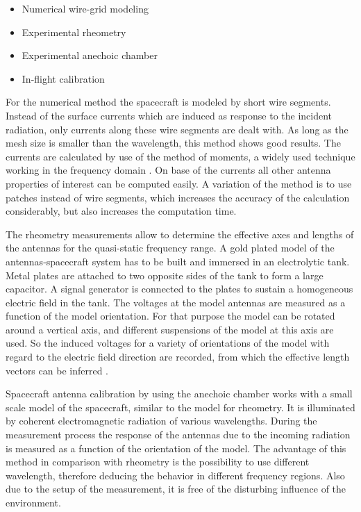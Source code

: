 \documentclass[a4paper,twocolumn]{esapub2005} %
\begin{document}
\begin{itemize}
    \item Numerical wire-grid modeling
\item Experimental rheometry
\item Experimental anechoic chamber
\item In-flight calibration
\end{itemize}

For the numerical method the spacecraft is modeled by short wire segments. Instead of the surface currents which are induced as response to the incident radiation, only currents along these wire segments are dealt with. As long as the mesh size is smaller than the wavelength, this method shows good results. The currents are calculated by use of the method of moments, a widely used technique working in the frequency domain \cite{harrington}. On base of the currents all other antenna properties of interest can be computed easily. A variation of the method is to use patches instead of wire segments, which increases the accuracy of the calculation considerably, but also increases the computation time.

The rheometry measurements allow to determine the effective axes and lengths of the antennas for the quasi-static frequency range. A gold plated model of the antennas-spacecraft system has to be built and immersed in an electrolytic tank. Metal plates are attached to two opposite sides of the tank to form a large capacitor. A signal generator is connected to the plates to sustain a homogeneous electric field in the tank. The voltages at the model antennas are measured as a function of the model orientation. For that purpose the model can be rotated around a vertical axis, and different suspensions of the model at this axis are used. So the induced voltages for a variety of orientations of the model with regard to the electric field direction are recorded, from which the effective length vectors can be inferred \cite{rheometry}.

Spacecraft antenna calibration by using the anechoic chamber works with a small scale model of the spacecraft, similar to the model for rheometry. It is illuminated by coherent electromagnetic radiation of various wavelengths. During the measurement process the response of the antennas due to the incoming radiation is measured as a function of the orientation of the model. The advantage of this method in comparison with rheometry is the possibility to use different wavelength, therefore deducing the behavior in different frequency regions. Also due to the setup of the measurement, it is free of the disturbing influence of the environment.
\end{document}
